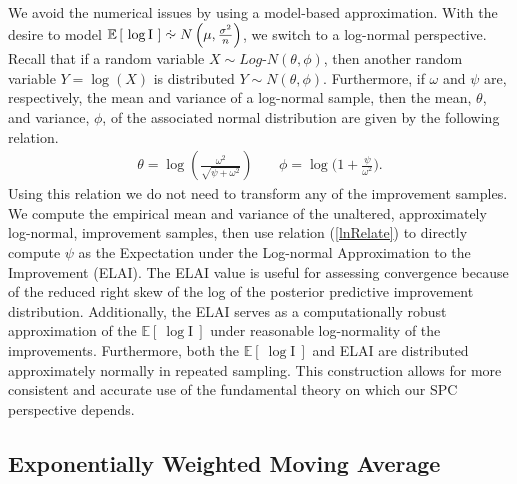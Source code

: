 \documentclass{article}
\newcommand{\E}[1]{
        \mathbb{E}\left[~#1~\right]
}
\newcommand*{\approxdist}{\mathrel{\vcenter{\offinterlineskip
\vskip-.25ex\hbox{\hskip.55ex$\cdot$}\vskip-.25ex\hbox{$\sim$}
\vskip-.5ex\hbox{\hskip.55ex$\cdot$}}}}
\begin{document}
%
%

%
We avoid the numerical issues by using a model-based approximation. With the 
desire to model $\mathbb{E}\left[~\log\text{I}~\right] \approxdist N\left(\mu, \frac{\sigma^2}{n}\right)$, 
we switch to a log-normal perspective. Recall that if a random variable 
\mbox{$X\sim Log$-$N(\theta, \phi)$,} then another random variable $Y=\log(X)$ 
is distributed $Y\sim N(\theta, \phi)$. Furthermore, if $\omega$ and $\psi$ are, 
respectively, the mean and variance of a log-normal sample, then the mean, 
$\theta$, and variance, $\phi$, of the associated normal distribution are 
given by the following relation.
\begin{eqnarray}
\theta = \log\left( \frac{\omega^2}{\sqrt{\psi+\omega^2}} \right) &~&  \phi = \log\bigg( 1+ \frac{\psi}{\omega^2} \bigg).
\label{lnRelate}
\end{eqnarray}
Using this relation we do not need to transform any of the improvement samples.
We compute the empirical mean and variance of the unaltered, approximately 
log-normal, improvement samples, then use relation (\ref{lnRelate}) to 
directly compute $\psi$ as the Expectation under the Log-normal Approximation 
to the Improvement (ELAI). The ELAI value is useful for assessing convergence 
because of the reduced right skew of the log of the posterior predictive 
improvement distribution. Additionally, the ELAI serves as a computationally 
robust approximation of the $\E{\log\text{I}}$ under reasonable log-normality 
of the improvements. Furthermore, both the $\E{\log\text{I}}$ and ELAI are 
distributed approximately normally in repeated sampling. This construction 
allows for more consistent and accurate use of the fundamental theory on which 
our SPC perspective depends.

%
%
\subsection{Exponentially Weighted Moving Average}
%
%
\end{document}
